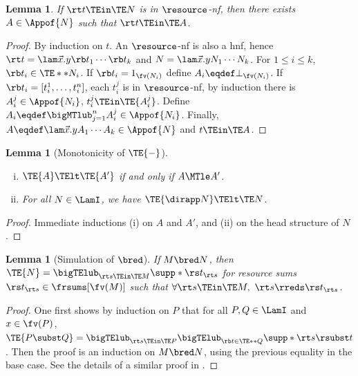 \documentclass[10pt,a4paper]{amsart}
\newtheorem{lemma}[theorem]{Lemma}
\theoremstyle{definition}
\newcommand{\bsub}{\begin{enumerate}[(i)]}
\newcommand{\esub}{\end{enumerate}}
\begin{document}
\setcounter{lem:normal-approximants}{\thetheorem}
\begin{lemma}
\label{lem:normal-approximants}
	If $\rt t \TEin \TE N$ is in $\resource$-nf, then
	there exists $A \in \Appof{N}$ such that $\rt t \TEin \TE A$.
\end{lemma}

	\begin{proof}
	By induction on $t$. An $\resource$-nf is also a hnf, hence
	$\rt t = \lam \vec{x}.y\rb t_1\cdots\rb t_k$ and
	$N = \lam \vec{x}.yN_1\cdots N_k$.
	For $1 \leq i \leq k$, $\rb t_i \in \TE**{N_i}$.
	If $\rb t_i = 1_{\fv(N_i)}$ define $A_i \eqdef \bot_{\fv(N_i)}$.
	If $\rb t_i = [t_i^1,\dots,t_i^n]$,
	each $t_i^j$ is in $\resource$-nf, by induction
	there is $A_i^j \in \Appof{N_i}$, $t_i^j \TEin \TE{A_i^j}$.
	Define $A_i \eqdef \bigMTlub_{j=1}^n A_i^j \in \Appof{N_i}$.
	Finally, $A \eqdef \lam \vec{x}.yA_1\cdots A_k \in \Appof{N}$
	and $t \TEin \TE A$.
	\end{proof}

\setcounter{lem:TE-monotone}{\thetheorem}
\begin{lemma}[Monotonicity of $\TE{-}$]\mbox{}
\label{lem:TE-monotone}
	\bsub
	\item $\TE{A} \TElt \TE{A'}$ if and only if $A \MTle A'$.
	\item For all $N \in \LamI$, we have $\TE{\dirapp N} \TElt \TE N$.
	\esub
\end{lemma}

	\begin{proof}
	Immediate inductions (i) on $A$ and $A'$,
	and (ii) on the head structure of $N$.
	\end{proof}

\setcounter{lem:rred-simul-bred}{\thetheorem}
\begin{lemma}[Simulation of $\bred$]
\label{lem:rred-simul-bred}
	If $M \bred N$, then $\TE{N} = 
	\bigTElub_{\rt s \TEin \TE M} \supp*{\rs t_{\rt s}}$
	for resource sums $\rs t_{\rt s} \in \frsums[\fv(M)]$
	such that $\forall \rt s \TEin \TE M,\ \rt s \rreds \rs t_{\rt s}$.
\end{lemma}

	\begin{proof}
	One first shows by induction on $P$ that
	for all $P,Q \in \LamI$ and $x \in \fv(P)$,
	$\TE{P \subst Q} = \bigTElub_{\rt s \TEin \TE P}
	\bigTElub_{\rb t \in \TE** Q} \supp*{ \rt s \rsubst t }$.
	Then the proof is an induction on $M \bred N$,
	using the previous equality in the base case.
	See the details of a similar proof in 
	\cite[Lemmas 4.1 and 4.2]{CerdaVaux23}.
	\end{proof}
\end{document}
